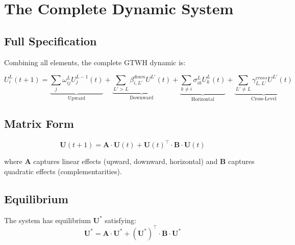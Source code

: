 \documentclass[12pt,a4paper]{article}
\begin{document}
\section{The Complete Dynamic System}
\label{sec:complete}

\subsection{Full Specification}

Combining all elements, the complete GTWH dynamic is:

\begin{tcolorbox}[colback=blue!5!white, colframe=blue!75!black, title=The GTWH Master Equation]
\begin{equation}
\boxed{
U^L_i(t+1) = \underbrace{\sum_{j} \omega^L_{ij} U^{L-1}_j(t)}_{\text{Upward}} + 
\underbrace{\sum_{L'>L} \beta^{down}_{i,L'} U^{L'}(t)}_{\text{Downward}} + 
\underbrace{\sum_{k \neq i} \sigma^L_{ik} U^L_k(t)}_{\text{Horizontal}} + 
\underbrace{\sum_{L' \neq L} \gamma^{cross}_{L,L'} U^{L'}(t)}_{\text{Cross-Level}}
}
\label{eq:master}
\end{equation}
\end{tcolorbox}

\subsection{Matrix Form}

\begin{equation}
\mathbf{U}(t+1) = \mathbf{A} \cdot \mathbf{U}(t) + \mathbf{U}(t)^\top \cdot \mathbf{B} \cdot \mathbf{U}(t)
\label{eq:matrix}
\end{equation}

where $\mathbf{A}$ captures linear effects (upward, downward, horizontal) and 
$\mathbf{B}$ captures quadratic effects (complementarities).

\subsection{Equilibrium}

The system has equilibrium $\mathbf{U}^*$ satisfying:
\begin{equation}
\mathbf{U}^* = \mathbf{A} \cdot \mathbf{U}^* + (\mathbf{U}^*)^\top \cdot \mathbf{B} \cdot \mathbf{U}^*
\label{eq:equilibrium}
\end{equation}
\end{document}

